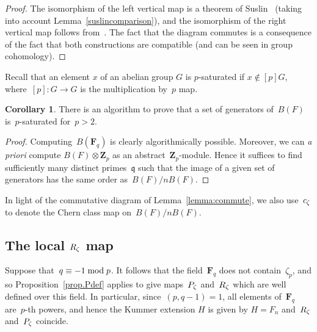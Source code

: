 \documentclass[12pt,reqno]{amsart}
\theoremstyle{definition}
\newtheorem{corollary}[theorem]{Corollary}
\newcommand{\frankchanged}[1]{{#1}}
\def\mod{\;\text{\rm mod}\;}
\def\Z{\mathbf Z}   %
\def\F{\mathbf F}   %
\def\nn{n}
\def\q{\mathfrak{q}}
\begin{document}
\begin{proof} 
The isomorphism of the left vertical map is a theorem of 
Suslin~\cite[Theorem~5.2]{Suslintwo} \frankchanged{(taking into account Lemma~\ref{suslincomparison})}, and the isomorphism 
of the right vertical map 
follows from~\cite{Hutch}. 
The fact that the diagram commutes 
is a consequence of the fact that both constructions are compatible (and 
can be seen in group cohomology).
\end{proof}

Recall that an element $x$ of an abelian group $G$ is $p$-saturated if 
$x\not\in [p]G$, where~$[p]:G \rightarrow G$ is the multiplication by~$p$ map.

\begin{corollary} 
There is an algorithm to prove that a set of generators of~$B(F)$
is~$p$-saturated for~$p > 2$.
\end{corollary}

\begin{proof} 
Computing~$B(\F_q)$ is clearly algorithmically possible. Moreover,
we can \emph{a priori} compute $B(F) \otimes \Z_p$ as an 
abstract~$\Z_p$-module. Hence it suffices to find sufficiently many 
distinct primes~$\q$ such that the image of
a given set of generators has the same order as~$B(F)/\nn B(F)$.
\end{proof}

In light of the commutative diagram
of Lemma~\ref{lemma:commute}, we also use~$c_\zeta$ to denote the Chern
class map on~$B(F)/\nn B(F)$.

\subsection{The local \texorpdfstring{$R_\zeta$}{Rz} map} 

Suppose that~$q \equiv -1 \mod p$.
It follows that the field~$\F_{q}$ does not contain~$\zeta_p$, and so
Proposition~\ref{prop.Pdef} applies to give maps~$P_{\zeta}$ and~$R_{\zeta}$
which are well defined over this field. In particular, 
since~$(p,q-1) = 1$, all elements of~$\F_{q}$
are~$p$-th powers, and hence the Kummer extension $H$ is given by
$H = F_n$ and~$R_{\zeta}$ and~$P_{\zeta}$ coincide.

\end{document}
